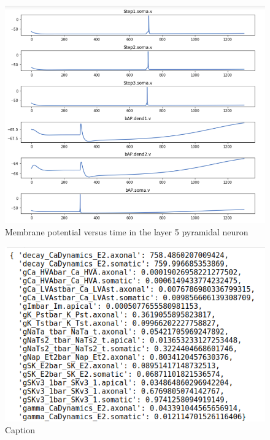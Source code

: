 \begin{figure}
    \centering
    \includegraphics{figures/l5pc}
    \caption{Membrane potential versus time in the layer 5 pyramidal neuron}
    \label{fig:after_optimization}
\end{figure}



\begin{figure}
    \centering
    \includegraphics{figures/parameters_opt_l5pc.png}
    \caption{Caption}
    \label{fig:ca1_parameters}
\end{figure}




